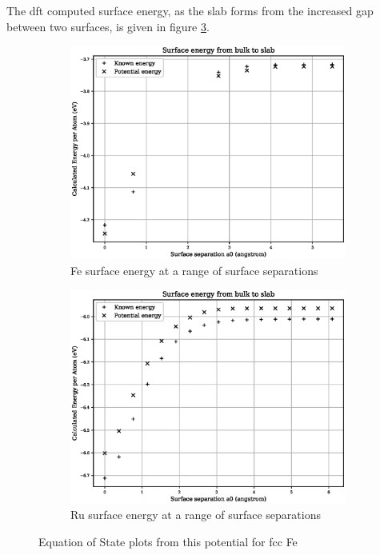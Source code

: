 The \acrshort{dft} computed surface energy, as the slab forms from the increased gap between two surfaces, is given in figure \ref{fig:feru-energy-fitting}.

\begin{figure}[htb]
\centering
\begin{subfigure}{.47\textwidth}
  \centering
  \includegraphics[width=.94\linewidth]{chapters/potentials_fe_pd_ru/feru_potential/fe_surface_energy.eps}  
  \caption{Fe surface energy at a range of surface separations}
  \label{fig:fepd-fefcc-rose}
\end{subfigure}
\begin{subfigure}{.47\textwidth}
  \centering
  \includegraphics[width=.94\linewidth]{chapters/potentials_fe_pd_ru/feru_potential/ru_surface_energy.eps}  
  \caption{Ru surface energy at a range of surface separations}
  \label{fig:feru-fefcc-bmeos}
\end{subfigure}
\caption{Equation of State plots from this potential for \acrshort{fcc} Fe}
\label{fig:feru-energy-fitting}
\end{figure}











